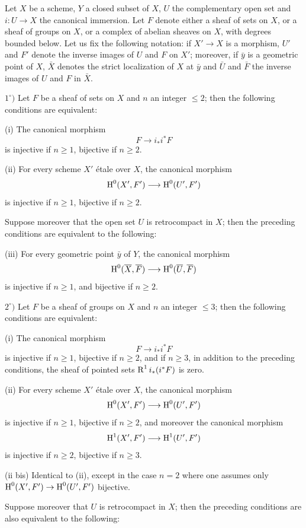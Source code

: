 %
\begin{proposition} \label{XIV.1.1}
Let $X$ be a scheme, $Y$ a closed subset of $X$, $U$ the complementary open set and $i:U\to X$ the canonical immersion. Let $F$ denote either a sheaf of sets on $X$, or a sheaf of groups on $X$, or a complex of abelian sheaves on $X$, with degrees bounded below. Let us fix the following notation: if $X'\to X$ is a morphism, $U'$ and $F'$ denote the inverse images of $U$ and $F$ on $X'$; moreover, if $\bar{y}$ is a geometric point of $X$, $\bar{X}$ denotes the strict localization of $X$ at $\bar{y}$ and $\bar{U}$ and $\bar{F}$ the inverse images of $U$ and $F$ in $\bar{X}$.

$1^\circ)$ Let $F$ be a sheaf of sets on $X$ and $n$ an integer $\leq 2$; then the following conditions are equivalent:

\textup{(i)} The canonical morphism
$$F\to i_*i^*F$$
is injective if $n\geq 1$, bijective if $n\geq 2$.

\textup{(ii)} For every scheme $X'$ \'etale over $X$, the canonical morphism
$$
\H^0(X', F')\to \H^0(U', F')
$$
is injective if $n\geq 1$, bijective if $n\geq 2$.

Suppose moreover that the open set $U$ is retrocompact in $X$; then the preceding conditions are equivalent to the following:

\textup{(iii)} For every geometric point $\bar{y}$ of $Y$, the canonical morphism
$$
\H^0(\bar{X}, \bar{F})\to \H^0(\bar{U}, \bar{F})$$
is injective if $n\geq 1$, and bijective if $n\geq 2$.

$2^\circ)$ Let $F$ be a sheaf of groups on $X$ and $n$ an integer $\leq 3$; then the following conditions are equivalent:

\textup{(i)} The canonical morphism
$$F\to i_*i^*F$$
is injective if $n\geq 1$, bijective if $n\geq 2$, and if $n\geq 3$, in addition to the preceding conditions, the sheaf of pointed sets $\operatorname{R}^1i_*(i^*F)$ is zero.

\textup{(ii)} For every scheme $X'$ \'etale over $X$, the canonical morphism
$$
\H^0(X', F')\to \H^0(U', F')
$$
is injective if $n\geq 1$, bijective if $n\geq 2$, and moreover the canonical morphism
$$
\H^1(X', F')\to \H^1(U', F')
$$
is injective if $n\geq 2$, bijective if $n\geq 3$.

\textup{(ii bis)} Identical to \textup{(ii)}, except in the case $n=2$ where one assumes only $\H^0(X', F')\to \H^0(U', F')$ bijective.

Suppose moreover that $U$ is retrocompact in $X$; then the preceding conditions are also equivalent to the following:


\end{proposition}
